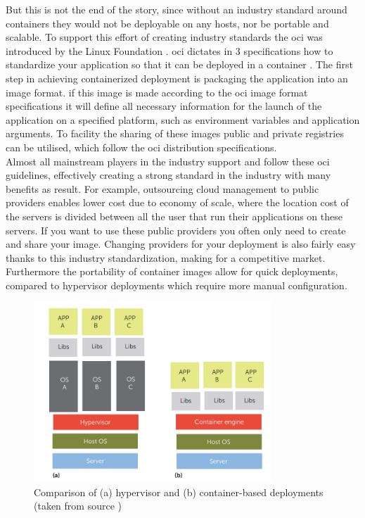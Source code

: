 But this is not the end of the story, since without an industry standard around containers they would not be deployable on any hosts, nor be portable and scalable. To support this effort of creating industry standards  the \acrfull{oci} \cite{OCI} was introduced by the Linux Foundation \cite{linuxfoundation}. \acrshort{oci} dictates in 3 specifications how to standardize your application so that it can be deployed in a container \cite{opencontainers}. The first step in achieving containerized deployment is packaging the application into an image format. if this image is made according to the \acrshort{oci} image format specifications it will define all necessary information for the launch of the application on a specified platform, such as environment variables and application arguments. To facility the sharing of these images public and private registries can be utilised, which follow the \acrshort{oci} distribution specifications.
\\[10pt]

Almost all mainstream players in the industry support and follow these \acrshort{oci} guidelines, effectively creating a strong standard in the industry with many benefits as result. For example, outsourcing cloud management to public providers enables lower cost due to economy of scale, where the location cost of the servers is divided between all the user that run their applications on these servers. If you want to use these public providers you often only need to create and share your image. Changing providers for your deployment is also fairly easy thanks to this industry standardization, making for a competitive market. Furthermore the portability of container images allow for quick deployments, compared to hypervisor deployments which require more manual configuration. 
\\[10pt]


\begin{figure}[htbp]
  \centering
  \includegraphics[width=0.8\textwidth]{images/bernstein-hypervisor-vs-container-deployment.png} 
  \caption{Comparison of (a) hypervisor and (b) container-based deployments (taken from source \cite{Bernstein2014})}
  \label{fig:compdeployment}
\end{figure}


